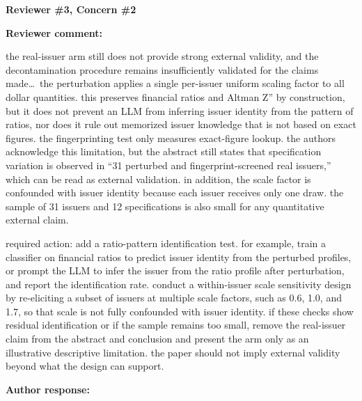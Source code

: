 \documentclass[11pt]{article}
\newcommand{\rvcomment}[1]{{\color{ReviewerGreen}#1}}
\newcommand{\concern}[1]{\textbf{\color{ReviewerGreen}#1}}
\begin{document}
\vspace{4pt}

\concern{Reviewer \#3, Concern \#2}

\concern{Reviewer comment:}

\rvcomment{the real-issuer arm still does not provide strong external validity, and the
decontamination procedure remains insufficiently validated for the claims made\dots\ the perturbation
applies a single per-issuer uniform scaling factor to all dollar quantities. this preserves financial
ratios and Altman Z'' by construction, but it does not prevent an LLM from inferring issuer identity
from the pattern of ratios, nor does it rule out memorized issuer knowledge that is not based on
exact figures. the fingerprinting test only measures exact-figure lookup. the authors acknowledge
this limitation, but the abstract still states that specification variation is observed in ``31
perturbed and fingerprint-screened real issuers,'' which can be read as external validation. in
addition, the scale factor is confounded with issuer identity because each issuer receives only one
draw. the sample of 31 issuers and 12 specifications is also small for any quantitative external
claim.}

\rvcomment{required action: add a ratio-pattern identification test. for example, train a classifier
on financial ratios to predict issuer identity from the perturbed profiles, or prompt the LLM to
infer the issuer from the ratio profile after perturbation, and report the identification rate.
conduct a within-issuer scale sensitivity design by re-eliciting a subset of issuers at multiple
scale factors, such as 0.6, 1.0, and 1.7, so that scale is not fully confounded with issuer
identity. if these checks show residual identification or if the sample remains too small, remove
the real-issuer claim from the abstract and conclusion and present the arm only as an illustrative
descriptive limitation. the paper should not imply external validity beyond what the design can
support.}

\textbf{Author response:}
\end{document}
